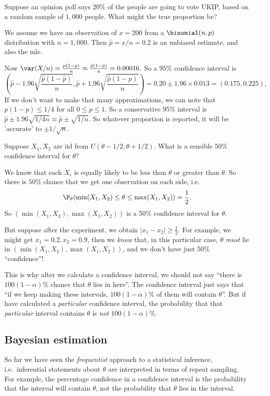 \documentclass[a4paper]{article}
\begin{document}
\begin{eg}
  Suppose an opinion poll says $20\%$ of the people are going to vote UKIP, based on a random sample of $1,000$ people. What might the true proportion be?

  We assume we have an observation of $x = 200$ from a $\binomial(n, p)$ distribution with $n = 1,000$. Then $\hat p = x/n = 0.2$ is an unbiased estimate, and also the mle.

  Now $\var(X/n) = \frac{p(1 - p)}{n}\approx \frac{\hat p(1 - \hat p)}{n} = 0.00016$. So a $95\%$ confidence interval is
  \[
    \left(\hat p - 1.96\sqrt{\frac{\hat p(1 - \hat p)}{n}}, \hat p + 1.96\sqrt{\frac{\hat p(1 - \hat p)}{n}}\right) = 0.20 \pm 1.96\times 0.013 = (0.175, 0.225),
  \]
  If we don't want to make that many approximations, we can note that $p(1 - p)\leq 1/4$ for all $0 \leq p \leq 1$. So a conservative $95\%$ interval is $\hat p \pm 1.96\sqrt{1/4n} \approx \hat p \pm \sqrt{1/n}$. So whatever proportion is reported, it will be 'accurate' to $\pm 1/\sqrt{n}$.
\end{eg}

\begin{eg}
  Suppose $X_1, X_2$ are iid from $U(\theta - 1/2, \theta + 1/2)$. What is a sensible $50\%$ confidence interval for $\theta$?

  We know that each $X_i$ is equally likely to be less than $\theta$ or greater than $\theta$. So there is $50\%$ chance that we get one observation on each side, i.e.
  \[
    \P_\theta(\min(X_1, X_2) \leq \theta \leq \max(X_1, X_2)) = \frac{1}{2}.
  \]
  So $(\min(X_1, X_2), \max (X_1, X_2))$ is a 50\% confidence interval for $\theta$.

  But suppose after the experiment, we obtain $|x_1 - x_2| \geq \frac{1}{2}$. For example, we might get $x_1 = 0.2, x_2 = 0.9$, then we \emph{know} that, in this particular case, $\theta$ \emph{must} lie in $(\min (X_1, X_2), \max(X_1, X_2))$, and we don't have just 50\% ``confidence''!

  This is why after we calculate a confidence interval, we should not say ``there is $100(1 - \alpha)\%$ chance that $\theta$ lies in here''. The confidence interval just says that ``if we keep making these intervals, $100(1 - \alpha)\%$ of them will contain $\theta$''. But if have calculated a \emph{particular} confidence interval, the probability that that \emph{particular} interval contains $\theta$ is \emph{not} $100(1 - \alpha)\%$.
\end{eg}

\subsection{Bayesian estimation}
So far we have seen the \emph{frequentist} approach to a statistical inference, i.e.\ inferential statements about $\theta$ are interpreted in terms of repeat sampling. For example, the percentage confidence in a confidence interval is the probability that the interval will contain $\theta$, not the probability that $\theta$ lies in the interval.
\end{document}
